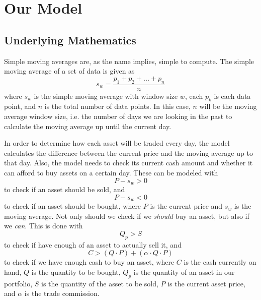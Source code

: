 \documentclass[12pt]{article}
\begin{document}
\section{Our Model}



\subsection{Underlying Mathematics}
Simple moving averages are, as the name implies, simple to compute. The simple moving average of a set of data is given as
\begin{equation}
    s_w = \frac{p_1 + p_2 + ... + p_n}{n}
    \label{sma}
\end{equation}
where $s_w$ is the simple moving average with window size $w$, each $p_k$ is each data point, and $n$ is the total number of data points. In this case, $n$ will
be the moving average window size, i.e. the number of days we are looking in the past to calculate the moving average up until the current day.

In order to determine how each asset will be traded every day, the model calculates the difference between the current price and the moving average up to that day.
Also, the model needs to check its current cash amount and whether it can afford to buy assets on a certain day. These can be modeled with
\begin{equation}
    P - s_w > 0
    \label{sell_decision}
\end{equation}
to check if an asset should be sold, and
\begin{equation}
    P - s_w < 0
    \label{buy_decision}
\end{equation}
to check if an asset should be bought, where $P$ is the current price and $s_w$ is the moving average. 
Not only should we check if we \textit{should} buy an asset, but also if we \textit{can}. This is done with
\begin{equation}
    Q_p > S
    \label{sell_check}
\end{equation}
to check if have enough of an asset to actually sell it,
and
\begin{equation}
    C > (Q \cdot P) + (\alpha \cdot Q \cdot P)
    \label{buy_check}
\end{equation}
to check if we have enough cash to buy an asset,
where $C$ is the cash currently on hand, $Q$ is the quantity to be bought, $Q_p$ is the quantity of an asset in our portfolio, $S$ is the quantity of the asset to be sold, $P$ is the current asset price, and $\alpha$ is the trade commission.
\end{document}
